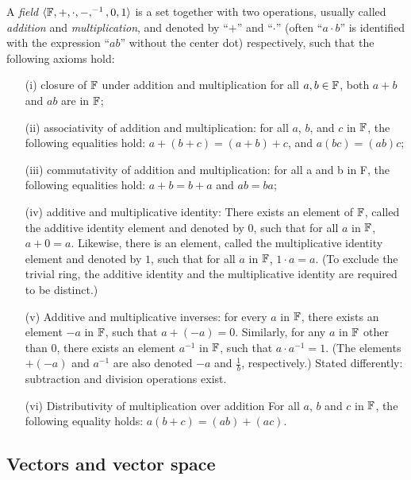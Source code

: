 A {\em field}  $\langle  {\Bbb F} , +, \cdot , -, ^{-1}, 0, 1\rangle$
is a set together with two operations,
usually called {\em addition} and {\em multiplication}, and denoted by ``$+$'' and ``$\cdot$''
(often  ``$a\cdot b$'' is identified with the expression ``$ab$'' without the center dot)
respectively, such that the following axioms hold:
\begin{itemize}
\item[(i)]
closure of ${\Bbb F}$ under addition and multiplication
for all $a, b \in {\Bbb F}$, both $a + b$ and $a   b$ are in ${\Bbb F}$;
\item[(ii)]
associativity of addition and multiplication:
for all $a$, $b$, and $c$ in ${\Bbb F}$,
the following equalities hold: $a + (b + c) = (a + b) + c$,
and
$a (b c) = (a  b) c$;
\item[(iii)]
commutativity of addition and multiplication:
for all a and b in F, the following equalities hold: $a + b = b + a$ and $a b = b  a$;
\item[(iv)]
additive and multiplicative identity:
There exists an element of ${\Bbb F}$,
called the additive identity element and denoted by $0$, such that for all $a$ in ${\Bbb F}$,
$a + 0 = a$.
Likewise, there is an element, called the multiplicative identity element and denoted by $1$,
such that for all $a$ in ${\Bbb F}$, $1 \cdot a  = a$.
(To exclude the trivial ring, the additive identity and the multiplicative
identity are required to be distinct.)
\item[(v)]
Additive and multiplicative inverses:
for every $a$ in ${\Bbb F}$, there exists an element $-a$ in ${\Bbb F}$, such that $a + (-a) = 0$.
Similarly, for any $a$ in ${\Bbb F}$ other than $0$, there exists an element $a^{-1}$ in ${\Bbb F}$,
such that $a \cdot a^{-1} = 1$.
(The elements $+ (-a)$ and  $a^{-1}$
are also denoted $-a$ and $\frac{1}{b}$, respectively.)
Stated differently: subtraction and division operations exist.
\item[(vi)]
Distributivity of multiplication over addition
For all $a$, $b$ and $c$ in ${\Bbb F}$, the following equality holds:
$a (b + c) = (a  b) + (a  c)$.
\end{itemize}

\subsection{Vectors and vector space}


